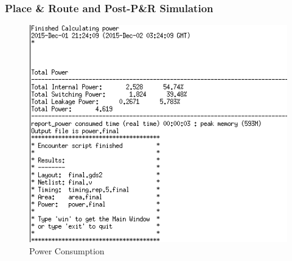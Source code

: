 \documentclass[12pt]{article}
\begin{document}
\subsubsection{Place \& Route and Post-P\&R Simulation}
\begin{figure}[H]
\centering
\includegraphics[width=.7\linewidth]{../case2/power}
\caption{Power Consumption}
\label{fig:power}
\end{figure}
\end{document}
